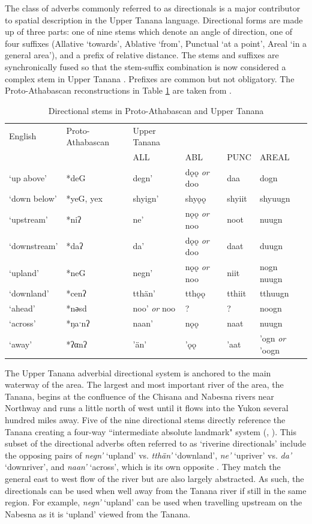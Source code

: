 The class of adverbs commonly referred to as directionals is a major contributor to spatial description in the Upper Tanana language. Directional forms are made up of three parts: one of nine stems which denote an angle of direction, one of four suffixes (Allative `towards', Ablative `from', Punctual `at a point', Areal `in a general area'), and a prefix of relative distance. The stems and suffixes are synchronically fused so that the stem-suffix combination is now considered a complex stem in Upper Tanana \citep[591]{LeerJ1989}. Prefixes are common but not obligatory. The Proto-Athabascan reconstructions in Table \ref{brucks:table:dir-adv} are taken from \citet[616]{LeerJ1989}.

\begin{table}
\caption{Directional stems in Proto-Athabascan and Upper Tanana}
\label{brucks:table:dir-adv}
\begin{tabular}{ l | l l l l l }
English & Proto-Athabascan & Upper Tanana \\
 & & ALL & ABL & PUNC & AREAL \\ \hline
‘up above’ & *deG & degn’ & dǫǫ {\em or} doo & daa & dogn \\
‘down below’ & *yeG, yex & shyign' & shyǫǫ & shyiit & shyuugn \\
‘upstream’ & *niʔ & ne' & nǫǫ {\em or} noo & noot & nuugn \\
‘downstream’ & *daʔ & da' & dǫǫ {\em or} doo & daat & duugn \\
‘upland’ & *neG & negn' & nǫǫ {\em or} noo & niit & nogn ~ nuugn \\
‘downland’ & *cenʔ & tthän' & tthǫǫ & tthiit & tthuugn \\
‘ahead’ & *nәsd & noo' {\em or} noo & ? & ? & noogn \\
‘across’ & *ŋaˑnʔ & naan' & nǫǫ & naat & nuugn \\
‘away’ & *ʔαnʔ & ’än' & ’ǫǫ & ’aat & ’ogn {\em or} ’oogn \\
\end{tabular}
\end{table}

The Upper Tanana adverbial directional system is anchored to the main waterway of the area. The largest and most important river of the area, the Tanana, begins at the confluence of the Chisana and Nabesna rivers near Northway and runs a little north of west until it flows into the Yukon several hundred miles away. Five of the nine directional stems directly reference the Tanana creating a four-way ``intermediate absolute landmark" system (\citealp[90-91]{LevinsonS2003}, \citealp[129]{KariJ2010}). This subset of the directional adverbs often referred to as `riverine directionals' include the opposing pairs of {\em negn'} `upland' vs. {\em tthän'} `downland',  {\em ne'} `upriver' vs. {\em da'} `downriver', and {\em naan'} `across', which is its own opposite \citep[576]{LeerJ1989}. They match the general east to west flow of the river but are also largely abstracted. As such, the directionals can be used when well away from the Tanana river if still in the same region. For example,  {\em negn'} `upland' can be used when travelling upstream on the Nabesna as it is `upland' viewed from the Tanana.

